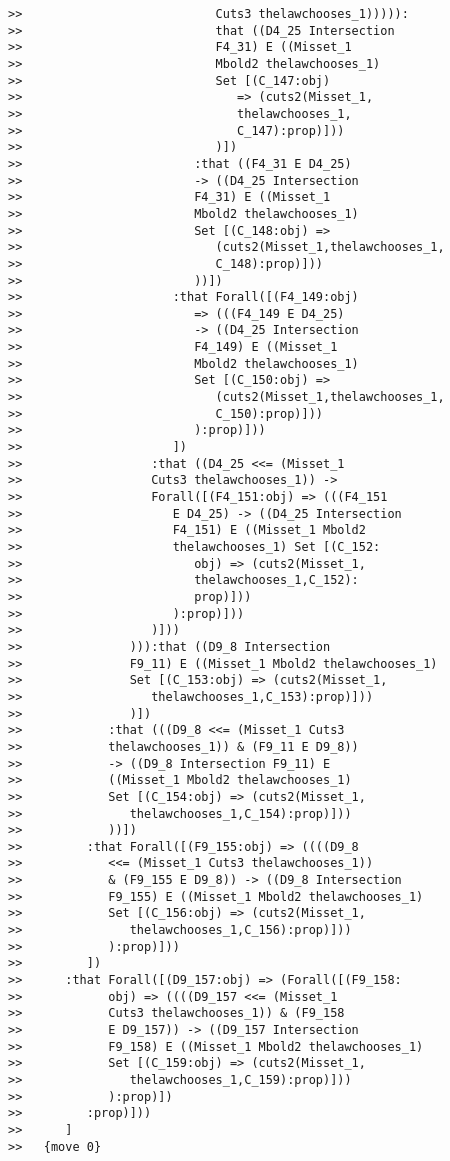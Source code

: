 \documentclass[12pt]{article}
\begin{document}
\begin{verbatim}
>>                           Cuts3 thelawchooses_1))))):
>>                           that ((D4_25 Intersection
>>                           F4_31) E ((Misset_1
>>                           Mbold2 thelawchooses_1)
>>                           Set [(C_147:obj)
>>                              => (cuts2(Misset_1,
>>                              thelawchooses_1,
>>                              C_147):prop)]))
>>                           )])
>>                        :that ((F4_31 E D4_25)
>>                        -> ((D4_25 Intersection
>>                        F4_31) E ((Misset_1
>>                        Mbold2 thelawchooses_1)
>>                        Set [(C_148:obj) =>
>>                           (cuts2(Misset_1,thelawchooses_1,
>>                           C_148):prop)]))
>>                        ))])
>>                     :that Forall([(F4_149:obj)
>>                        => (((F4_149 E D4_25)
>>                        -> ((D4_25 Intersection
>>                        F4_149) E ((Misset_1
>>                        Mbold2 thelawchooses_1)
>>                        Set [(C_150:obj) =>
>>                           (cuts2(Misset_1,thelawchooses_1,
>>                           C_150):prop)]))
>>                        ):prop)]))
>>                     ])
>>                  :that ((D4_25 <<= (Misset_1
>>                  Cuts3 thelawchooses_1)) ->
>>                  Forall([(F4_151:obj) => (((F4_151
>>                     E D4_25) -> ((D4_25 Intersection
>>                     F4_151) E ((Misset_1 Mbold2
>>                     thelawchooses_1) Set [(C_152:
>>                        obj) => (cuts2(Misset_1,
>>                        thelawchooses_1,C_152):
>>                        prop)]))
>>                     ):prop)]))
>>                  )]))
>>               ))):that ((D9_8 Intersection
>>               F9_11) E ((Misset_1 Mbold2 thelawchooses_1)
>>               Set [(C_153:obj) => (cuts2(Misset_1,
>>                  thelawchooses_1,C_153):prop)]))
>>               )])
>>            :that (((D9_8 <<= (Misset_1 Cuts3
>>            thelawchooses_1)) & (F9_11 E D9_8))
>>            -> ((D9_8 Intersection F9_11) E
>>            ((Misset_1 Mbold2 thelawchooses_1)
>>            Set [(C_154:obj) => (cuts2(Misset_1,
>>               thelawchooses_1,C_154):prop)]))
>>            ))])
>>         :that Forall([(F9_155:obj) => ((((D9_8
>>            <<= (Misset_1 Cuts3 thelawchooses_1))
>>            & (F9_155 E D9_8)) -> ((D9_8 Intersection
>>            F9_155) E ((Misset_1 Mbold2 thelawchooses_1)
>>            Set [(C_156:obj) => (cuts2(Misset_1,
>>               thelawchooses_1,C_156):prop)]))
>>            ):prop)]))
>>         ])
>>      :that Forall([(D9_157:obj) => (Forall([(F9_158:
>>            obj) => ((((D9_157 <<= (Misset_1
>>            Cuts3 thelawchooses_1)) & (F9_158
>>            E D9_157)) -> ((D9_157 Intersection
>>            F9_158) E ((Misset_1 Mbold2 thelawchooses_1)
>>            Set [(C_159:obj) => (cuts2(Misset_1,
>>               thelawchooses_1,C_159):prop)]))
>>            ):prop)])
>>         :prop)]))
>>      ]
>>   {move 0}




\end{verbatim}
\end{document}
